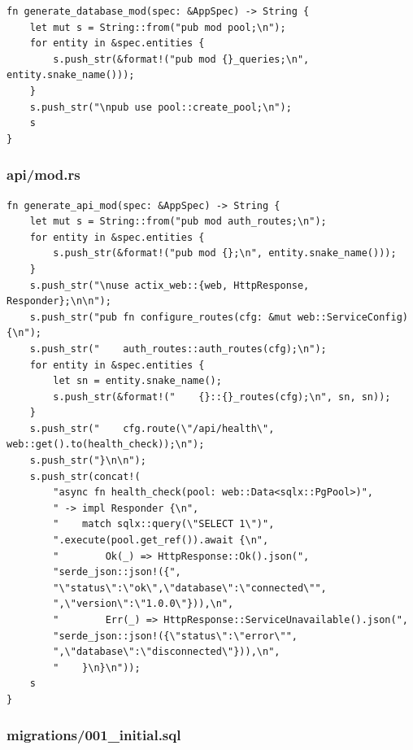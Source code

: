 \documentclass[11pt,a4paper]{article}
\begin{document}
\begin{lstlisting}
fn generate_database_mod(spec: &AppSpec) -> String {
    let mut s = String::from("pub mod pool;\n");
    for entity in &spec.entities {
        s.push_str(&format!("pub mod {}_queries;\n", entity.snake_name()));
    }
    s.push_str("\npub use pool::create_pool;\n");
    s
}
\end{lstlisting}

\subsubsection{api/mod.rs}

\begin{lstlisting}
fn generate_api_mod(spec: &AppSpec) -> String {
    let mut s = String::from("pub mod auth_routes;\n");
    for entity in &spec.entities {
        s.push_str(&format!("pub mod {};\n", entity.snake_name()));
    }
    s.push_str("\nuse actix_web::{web, HttpResponse, Responder};\n\n");
    s.push_str("pub fn configure_routes(cfg: &mut web::ServiceConfig) {\n");
    s.push_str("    auth_routes::auth_routes(cfg);\n");
    for entity in &spec.entities {
        let sn = entity.snake_name();
        s.push_str(&format!("    {}::{}_routes(cfg);\n", sn, sn));
    }
    s.push_str("    cfg.route(\"/api/health\", web::get().to(health_check));\n");
    s.push_str("}\n\n");
    s.push_str(concat!(
        "async fn health_check(pool: web::Data<sqlx::PgPool>)",
        " -> impl Responder {\n",
        "    match sqlx::query(\"SELECT 1\")",
        ".execute(pool.get_ref()).await {\n",
        "        Ok(_) => HttpResponse::Ok().json(",
        "serde_json::json!({",
        "\"status\":\"ok\",\"database\":\"connected\"",
        ",\"version\":\"1.0.0\"})),\n",
        "        Err(_) => HttpResponse::ServiceUnavailable().json(",
        "serde_json::json!({\"status\":\"error\"",
        ",\"database\":\"disconnected\"})),\n",
        "    }\n}\n"));
    s
}
\end{lstlisting}

\subsubsection{migrations/001\_initial.sql}
\end{document}

